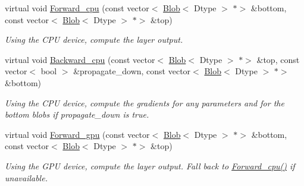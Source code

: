 \begin{DoxyCompactItemize}
\item 
\mbox{\label{classcaffe_1_1_crop_layer_ace1eb45b15e9e9f304966ac13152cb59}} 
virtual void \mbox{\hyperlink{classcaffe_1_1_crop_layer_ace1eb45b15e9e9f304966ac13152cb59}{Forward\+\_\+cpu}} (const vector$<$ \mbox{\hyperlink{classcaffe_1_1_blob}{Blob}}$<$ Dtype $>$ $\ast$$>$ \&bottom, const vector$<$ \mbox{\hyperlink{classcaffe_1_1_blob}{Blob}}$<$ Dtype $>$ $\ast$$>$ \&top)
\begin{DoxyCompactList}\small\item\em Using the C\+PU device, compute the layer output. \end{DoxyCompactList}\item 
\mbox{\label{classcaffe_1_1_crop_layer_ab73f11ec5c3927435ab9c7e1706919cd}} 
virtual void \mbox{\hyperlink{classcaffe_1_1_crop_layer_ab73f11ec5c3927435ab9c7e1706919cd}{Backward\+\_\+cpu}} (const vector$<$ \mbox{\hyperlink{classcaffe_1_1_blob}{Blob}}$<$ Dtype $>$ $\ast$$>$ \&top, const vector$<$ bool $>$ \&propagate\+\_\+down, const vector$<$ \mbox{\hyperlink{classcaffe_1_1_blob}{Blob}}$<$ Dtype $>$ $\ast$$>$ \&bottom)
\begin{DoxyCompactList}\small\item\em Using the C\+PU device, compute the gradients for any parameters and for the bottom blobs if propagate\+\_\+down is true. \end{DoxyCompactList}\item 
\mbox{\label{classcaffe_1_1_crop_layer_a507c00c0d53094e5e885ba9c22028ebb}} 
virtual void \mbox{\hyperlink{classcaffe_1_1_crop_layer_a507c00c0d53094e5e885ba9c22028ebb}{Forward\+\_\+gpu}} (const vector$<$ \mbox{\hyperlink{classcaffe_1_1_blob}{Blob}}$<$ Dtype $>$ $\ast$$>$ \&bottom, const vector$<$ \mbox{\hyperlink{classcaffe_1_1_blob}{Blob}}$<$ Dtype $>$ $\ast$$>$ \&top)
\begin{DoxyCompactList}\small\item\em Using the G\+PU device, compute the layer output. Fall back to \mbox{\hyperlink{classcaffe_1_1_crop_layer_ace1eb45b15e9e9f304966ac13152cb59}{Forward\+\_\+cpu()}} if unavailable. \end{DoxyCompactList}\item 
\mbox{\label{classcaffe_1_1_crop_layer_a5797567b3f3c31a4b59b636f80c0040e}} 

\end{DoxyCompactItemize}
